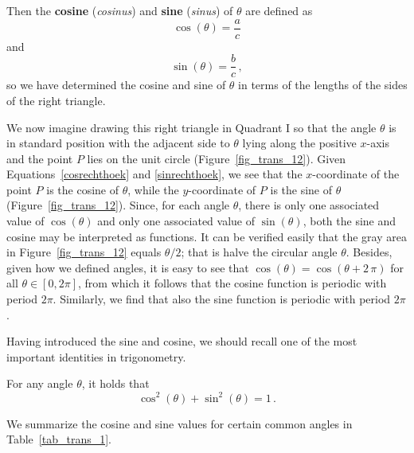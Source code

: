 Then the \textbf{cosine} (\textit{cosinus}) and \textbf{sine} (\textit{sinus}) of $\theta$ are defined as
\begin{equation}
\cos(\theta) = \dfrac{a}{c}
\label{cosrechthoek}
\end{equation}
 and 
\begin{equation}
\sin(\theta) = \dfrac{b}{c}\,,
\label{sinrechthoek}
\end{equation}
so we have determined the cosine and sine of $\theta$ in terms of the lengths of the sides of the right triangle. 




We now imagine drawing this right triangle in Quadrant I  so that the angle $\theta$ is in standard position with the adjacent side to $\theta$ lying along the positive $x$-axis and the point $P$ lies on the unit circle (Figure~\ref{fig_trans_12}). Given Equations~\eqref{cosrechthoek} and \eqref{sinrechthoek}, we  see that the $x$-coordinate of the point $P$   is the cosine of $\theta$, while the $y$-coordinate of $P$ is the  sine of $\theta$ (Figure~\ref{fig_trans_12}).  Since, for each angle $\theta$, there is only one associated value of $\cos(\theta)$ and only one associated value of $\sin(\theta)$, both the sine and cosine may be interpreted as functions. It can be verified easily  that the gray area in Figure~\ref{fig_trans_12} equals $\theta/2$; that is halve the circular angle $\theta$. Besides, given how we defined angles, it is easy to see that $\cos(\theta)=\cos(\theta+2\,\pi)$ for all $\theta\in[0,2\pi]$, from which it follows that the cosine function is periodic with period $2\pi$. Similarly, we find that also the sine function is periodic with period $2\pi$.





Having introduced the sine and cosine, we should recall one of the most important identities in trigonometry.


\begin{theorem} \label{cosinesinepythid}
For any angle $\theta$, it holds that
\begin{equation}
\cos^{2}(\theta) + \sin^{2}(\theta) = 1\,.
\label{pyth}
\end{equation}

\end{theorem}

We summarize the cosine and sine values for certain common angles in Table~\ref{tab_trans_1}. 


